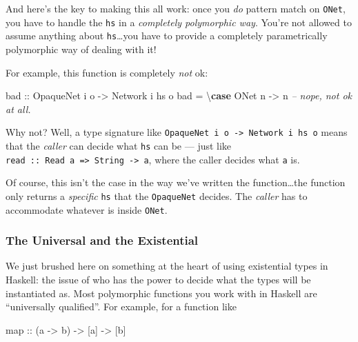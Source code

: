 \documentclass[]{article}
\newenvironment{Shaded}{}{}
\newcommand{\KeywordTok}[1]{\textcolor[rgb]{0.00,0.44,0.13}{\textbf{{#1}}}}
\newcommand{\DataTypeTok}[1]{\textcolor[rgb]{0.56,0.13,0.00}{{#1}}}
\newcommand{\CommentTok}[1]{\textcolor[rgb]{0.38,0.63,0.69}{\textit{{#1}}}}
\newcommand{\OtherTok}[1]{\textcolor[rgb]{0.00,0.44,0.13}{{#1}}}
\newcommand{\FunctionTok}[1]{\textcolor[rgb]{0.02,0.16,0.49}{{#1}}}
\newcommand{\NormalTok}[1]{{#1}}
\begin{document}
And here's the key to making this all work: once you \emph{do} pattern match on
\texttt{ONet}, you have to handle the \texttt{hs} in a \emph{completely
polymorphic way}. You're not allowed to assume anything about
\texttt{hs}\ldots{}you have to provide a completely parametrically polymorphic
way of dealing with it!

For example, this function is completely \emph{not} ok:

\begin{Shaded}
\begin{Highlighting}[]
\OtherTok{bad ::} \DataTypeTok{OpaqueNet} \NormalTok{i o }\OtherTok{->} \DataTypeTok{Network} \NormalTok{i hs o}
\NormalTok{bad }\FunctionTok{=} \NormalTok{\textbackslash{}}\KeywordTok{case} \DataTypeTok{ONet} \NormalTok{n }\OtherTok{->} \NormalTok{n          }\CommentTok{-- nope, not ok at all.}
\end{Highlighting}
\end{Shaded}

Why not? Well, a type signature like
\texttt{OpaqueNet\ i\ o\ -\textgreater{}\ Network\ i\ hs\ o} means that the
\emph{caller} can decide what \texttt{hs} can be --- just like
\texttt{read\ ::\ Read\ a\ =\textgreater{}\ String\ -\textgreater{}\ a}, where
the caller decides what \texttt{a} is.

Of course, this isn't the case in the way we've written the function\ldots{}the
function only returns a \emph{specific} \texttt{hs} that the \texttt{OpaqueNet}
decides. The \emph{caller} has to accommodate whatever is inside \texttt{ONet}.

\subsubsection{The Universal and the
Existential}\label{the-universal-and-the-existential}

We just brushed here on something at the heart of using existential types in
Haskell: the issue of who has the power to decide what the types will be
instantiated as. Most polymorphic functions you work with in Haskell are
``universally qualified''. For example, for a function like

\begin{Shaded}
\begin{Highlighting}[]
\NormalTok{map}\OtherTok{ ::} \NormalTok{(a }\OtherTok{->} \NormalTok{b) }\OtherTok{->} \NormalTok{[a] }\OtherTok{->} \NormalTok{[b]}
\end{Highlighting}
\end{Shaded}
\end{document}
